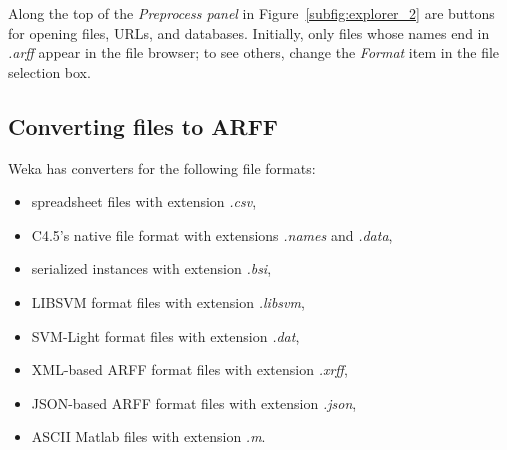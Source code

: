 Along the top of the \textit{Preprocess panel} in
Figure~\ref{subfig:explorer_2} are buttons for opening files, URLs,
and databases. Initially, only files whose names end in \textit{.arff}
appear in the file browser; to see others, change the \textit{Format}
item in the file selection box.

\subsection{Converting files to ARFF}

Weka has converters for the following file formats: 

\begin{itemize}
\item spreadsheet files with extension \textit{.csv},
\item C4.5's native file format with extensions \textit{.names} and \textit{.data},
\item serialized instances with extension \textit{.bsi},
\item LIBSVM format files with extension \textit{.libsvm},
\item SVM-Light format files with extension \textit{.dat},
\item XML-based ARFF format files with extension \textit{.xrff},
\item JSON-based ARFF format files with extension \textit{.json},
\item ASCII Matlab files with extension \textit{.m}.
\end{itemize}

